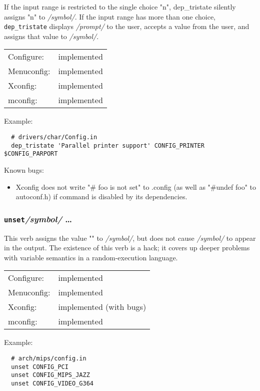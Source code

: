 If the input range is restricted to the single choice "n", dep\_tristate
silently assigns "n" to \textit{/symbol/}.  If the input range has more than
one choice, \texttt{dep\_tristate} displays \textit{/prompt/} to the user, accepts a value
from the user, and assigns that value to \textit{/symbol/}.

\begin{tabular}{ll}
Configure:  &implemented\\
Menuconfig: &implemented\\
Xconfig:    &implemented\\
mconfig:    &implemented\\
\end{tabular}

Example:
{\small\begin{verbatim}
  # drivers/char/Config.in
  dep_tristate 'Parallel printer support' CONFIG_PRINTER $CONFIG_PARPORT
\end{verbatim}}

Known bugs:
\begin{itemize}
\item Xconfig does not write "\# foo is not set" to .config (as well as
  "\#undef foo" to autoconf.h) if command is disabled by its dependencies.
\end{itemize}


\subsubsection{\texttt{unset}\quad \textit{/symbol/} \quad\dots}

This verb assigns the value "" to \textit{/symbol/}, but does not cause 
\textit{/symbol/}
to appear in the output.  The existence of this verb is a hack; it covers
up deeper problems with variable semantics in a random-execution language.

\begin{tabular}{ll}
Configure:  &implemented\\
Menuconfig: &implemented\\
Xconfig:    &implemented (with bugs)\\
mconfig:    &implemented\\
\end{tabular}

Example:
{\small\begin{verbatim}
  # arch/mips/config.in
  unset CONFIG_PCI
  unset CONFIG_MIPS_JAZZ
  unset CONFIG_VIDEO_G364
\end{verbatim}}



